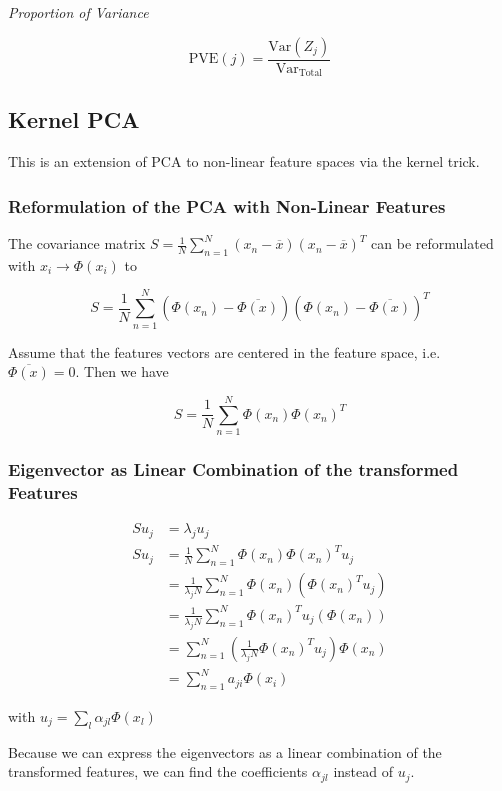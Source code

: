 \emph{Proportion of Variance}

\[
    \mathrm{PVE}(j) = \frac{ \mathrm{Var}(Z_j)}{ \mathrm{Var}_{\text{Total}}}
\]

\subsection{Kernel PCA}

This is an extension of PCA to non-linear feature spaces via the kernel trick.

\subsubsection{Reformulation of the PCA with Non-Linear Features}

The covariance matrix \(S = \frac{1}{N} \sum_{n = 1}^{N} (x_n - \overline{x})(x_n - \overline{x})^T\) can 
be reformulated with \(x_i \to \Phi(x_i)\) to 

\[
    S = \frac{1}{N} \sum_{n = 1}^{N} (\Phi(x_n) - \overline{\Phi(x)})(\Phi(x_n) - \overline{\Phi(x)})^T
\]

Assume that the features vectors are centered in the feature space, i.e. \(\overline{\Phi(x)} = 0\). 
Then we have

\[
    S = \frac{1}{N} \sum_{n = 1}^{N} \Phi(x_n) \Phi(x_n)^T
\]

\subsubsection{Eigenvector as Linear Combination of the transformed Features}

\begin{align*}
    S u_j &= \lambda_j u_j  \\ 
    S u_j &= \frac{1}{N} \sum_{n = 1}^{N} \Phi(x_n) \Phi(x_n)^T u_j  \\ 
    &= \frac{1}{\lambda_j N} \sum_{n = 1}^{N} \Phi(x_n) (\Phi(x_n)^T u_j)  \\
    &= \frac{1}{\lambda_j N} \sum_{n = 1}^{N} \Phi(x_n)^T u_j (\Phi(x_n))  \\
    &= \sum_{n = 1}^{N} \left( \frac{1}{\lambda_j N} \Phi(x_n)^T u_j \right) \Phi(x_n) \\ 
    &= \sum_{n = 1}^{N} a_{ji} \Phi(x_i)
\end{align*}

with \(u_j = \sum_{l} \alpha_{jl} \Phi(x_l)\)

Because we can express the eigenvectors as a linear combination of the transformed features, we can 
find the coefficients \(\alpha_{jl}\) instead of \(u_j\). 

